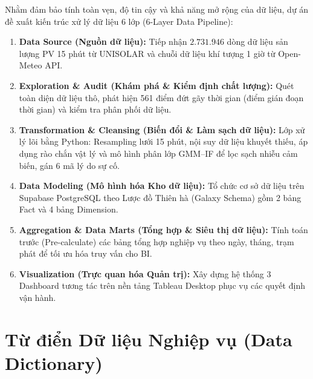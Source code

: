 \documentclass[12pt, a4paper]{report}
\begin{document}
Nhằm đảm bảo tính toàn vẹn, độ tin cậy và khả năng mở rộng của dữ liệu, dự án đề xuất kiến trúc xử lý dữ liệu 6 lớp (6-Layer Data Pipeline):

\begin{enumerate}[label=\textbf{Layer \arabic* --}, leftmargin=*]
    \item \textbf{Data Source (Nguồn dữ liệu):} Tiếp nhận $2.731.946$ dòng dữ liệu sản lượng PV 15 phút từ UNISOLAR và chuỗi dữ liệu khí tượng 1 giờ từ Open-Meteo API.
    \item \textbf{Exploration \& Audit (Khám phá \& Kiểm định chất lượng):} Quét toàn diện dữ liệu thô, phát hiện 561 điểm đứt gãy thời gian (điểm gián đoạn thời gian) và kiểm tra phân phối dữ liệu.
    \item \textbf{Transformation \& Cleansing (Biến đổi \& Làm sạch dữ liệu):} Lớp xử lý lõi bằng Python: Resampling lưới 15 phút, nội suy dữ liệu khuyết thiếu, áp dụng rào chắn vật lý và mô hình phân lớp GMM--IF để lọc sạch nhiễu cảm biến, gán 6 mã lý do sự cố.
    \item \textbf{Data Modeling (Mô hình hóa Kho dữ liệu):} Tổ chức cơ sở dữ liệu trên Supabase PostgreSQL theo Lược đồ Thiên hà (Galaxy Schema) gồm 2 bảng Fact và 4 bảng Dimension.
    \item \textbf{Aggregation \& Data Marts (Tổng hợp \& Siêu thị dữ liệu):} Tính toán trước (Pre-calculate) các bảng tổng hợp nghiệp vụ theo ngày, tháng, trạm phát để tối ưu hóa truy vấn cho BI.
    \item \textbf{Visualization (Trực quan hóa Quản trị):} Xây dựng hệ thống 3 Dashboard tương tác trên nền tảng Tableau Desktop phục vụ các quyết định vận hành.
\end{enumerate}

\section{Từ điển Dữ liệu Nghiệp vụ (Data Dictionary)}
\label{sec:tudien_dulieu}
\end{document}
